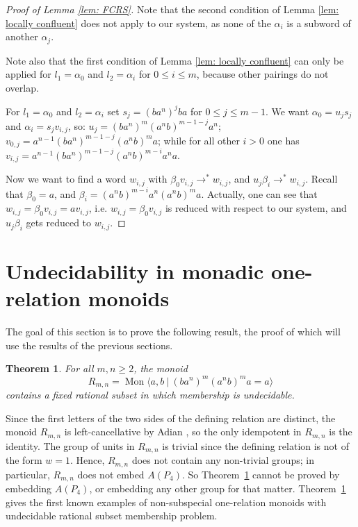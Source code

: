 \documentclass{amsart}
\newcommand{\Mpres}[2]{\operatorname{Mon}\bigl\langle #1\:|\:#2 \bigr\rangle}
\newcommand{\M}{R_{m,n}}
\theoremstyle{plain}
\newtheorem{theorem}{Theorem}[section]
\theoremstyle{definition}
\begin{document}
\begin{proof}[Proof of Lemma \ref{lem: FCRS}]
Note that the second condition of Lemma \ref{lem: locally confluent} does not apply to our system, as none of the $\alpha_i$ is a subword of another $\alpha_j$.

Note also that the first condition of Lemma \ref{lem: locally confluent} can only be applied for $l_1 = \alpha_0$ and $l_2 = \alpha_i$ for $0 \leq i \leq m$, because other pairings do not overlap. 

For $l_1 = \alpha_0$ and $l_2 = \alpha_i$ set $s_j = (ba^n)^j ba$ for $0 \leq j \leq m-1$. We want $\alpha_0 = u_js_j$ and $\alpha_i = s_j v_{i,j}$, so: $u_j = (ba^n)^m (a^nb)^{m-1-j}a^n$; $v_{0,j} = a^{n-1}(ba^n)^{m-1-j}(a^nb)^{m}a$; while for all other $i > 0$ one has $v_{i,j} = a^{n-1}(ba^n)^{m-1-j}(a^nb)^{m-i}a^n a$.

Now we want to find a word $w_{i,j}$ with $\beta_0 v_{i,j} \rightarrow ^* w_{i,j}$, and $u_j \beta_i \rightarrow ^* w_{i,j}$. Recall that $\beta_0 = a$, and $\beta_i = (a^nb)^{m-i} a^n (a^n b)^{m} a$. Actually, one can see  that $w_{i,j} = \beta_0 v_{i,j} = a v_{i,j}$, i.e. $w_{i,j} = \beta_0 v_{i,j}$ is reduced with respect to our system, and $u_j \beta_i$ gets reduced to $w_{i,j}$.
\end{proof}





\section{Undecidability in monadic one-relation monoids}\label{Sec:Guba-type-monoids}

The goal of this section is to prove the following result, the proof of which will use the results of the previous sections. 

\begin{theorem}\label{thm_UndecRatSubsetGubaType}
For all $m,n \geq 2$,  
the monoid 
\[
\M=
\Mpres{a, b}{(b a^n)^m(a^n b)^ma = a}
\]
contains a fixed rational subset in which membership is undecidable.
\end{theorem}

Since the first letters of the two sides of the defining relation are distinct, the monoid $\M$ is left-cancellative by Adian \cite[Theorem~3]{Adian1960}, so the only idempotent in $\M$ is the identity. The group of units in $\M$ is trivial since the defining relation is not of the form $w=1$. Hence, $\M$ does not contain any non-trivial groups; in particular, $\M$ does not embed $A(P_4)$. So Theorem~\ref{thm_UndecRatSubsetGubaType} cannot be proved by embedding $A(P_4)$, or embedding any other group for that matter. Theorem~\ref{thm_UndecRatSubsetGubaType} gives the first known examples of non-subspecial one-relation monoids with undecidable rational subset membership problem.  
\end{document}
